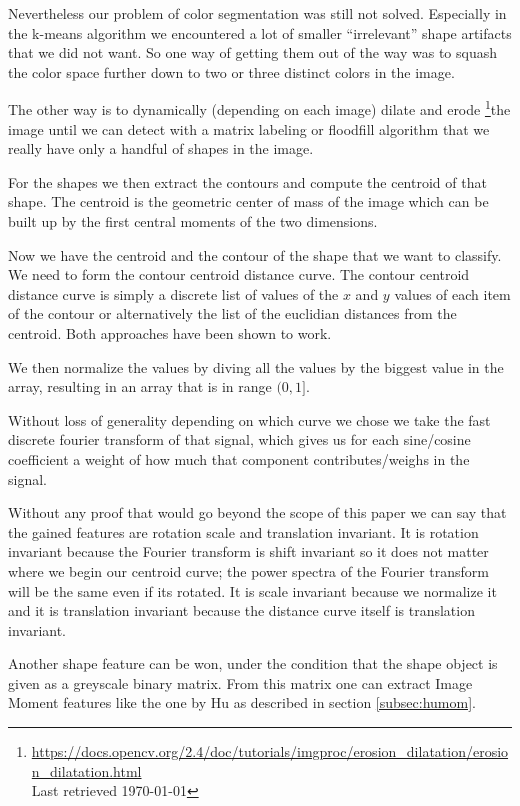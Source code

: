 \documentclass[journal]{vgtc}       %
\begin{document}
Nevertheless our problem of color segmentation was still not solved. Especially in the k-means algorithm we encountered a lot of smaller ``irrelevant'' shape artifacts that we did not want.
So one way of getting them out of the way was to squash the color space further down to two or three distinct colors in the image.

The other way is to  dynamically (depending on each image) dilate and erode \footnote{\url{https://docs.opencv.org/2.4/doc/tutorials/imgproc/erosion_dilatation/erosion_dilatation.html}\\ Last retrieved \today}the image until we can detect with a matrix labeling  or   floodfill algorithm that we really have only a handful of shapes in the image.

For the shapes we then extract the contours and compute the centroid of that shape.
The centroid is the geometric center of mass of the image which can be built up by the first central moments of the two dimensions.

Now we have the centroid and the contour of the shape that we want to classify. We need to form the contour centroid distance curve.
The contour centroid distance curve is simply a discrete list of values of the \(x\) and \(y\)  values of each item of the contour  or alternatively the list of the euclidian  distances from the centroid. Both approaches have been shown to work.

We then normalize the values by diving all the values by the biggest value in the array, resulting in an array that is in range $(0,1]$.

Without loss of generality depending on which curve we chose we take the fast discrete fourier transform of that signal, which gives us for each sine/cosine coefficient a weight of how much  that component contributes/weighs in the signal.

Without any proof that would go beyond the scope of this paper we can say that the gained features are rotation scale and translation invariant. It is rotation invariant because the Fourier transform is shift invariant so it does not matter where we begin our centroid curve; the power spectra of the Fourier transform will be the same even if its rotated. It is scale invariant because we normalize it and it is translation invariant because the distance curve itself is  translation invariant.

Another shape feature can be won, under the condition that the shape object is given as a greyscale binary matrix. From this matrix one can extract Image Moment features like the one by Hu as described in section \ref{subsec:humom}.
\end{document}
